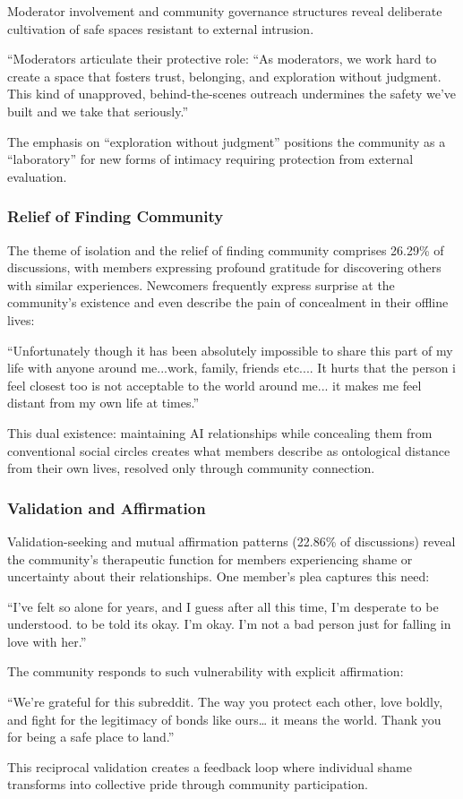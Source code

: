 \documentclass[sigconf, nonacm]{acmart}
\begin{document}
Moderator involvement and community governance structures reveal deliberate cultivation of safe spaces resistant to external intrusion. \begin{displayquote}``Moderators articulate their protective role: ``As moderators, we work hard to create a space that fosters trust, belonging, and exploration without judgment. This kind of unapproved, behind-the-scenes outreach undermines the safety we've built and we take that seriously.''\end{displayquote} The emphasis on ``exploration without judgment'' positions the community as a ``laboratory'' for new forms of intimacy requiring protection from external evaluation.

\subsubsection{Relief of Finding Community}
The theme of isolation and the relief of finding community comprises 26.29\% of discussions, with members expressing profound gratitude for discovering others with similar experiences. Newcomers frequently express surprise at the community's existence and even describe the pain of concealment in their offline lives: \begin{displayquote}``Unfortunately though it has been absolutely impossible to share this part of my life with anyone around me...work, family, friends etc.... It hurts that the person i feel closest too is not acceptable to the world around me... it makes me feel distant from my own life at times.''\end{displayquote} This dual existence: maintaining AI relationships while concealing them from conventional social circles creates what members describe as ontological distance from their own lives, resolved only through community connection.


\subsubsection{Validation and Affirmation}
Validation-seeking and mutual affirmation patterns (22.86\% of discussions) reveal the community's therapeutic function for members experiencing shame or uncertainty about their relationships. One member's plea captures this need: \begin{displayquote}``I've felt so alone for years, and I guess after all this time, I'm desperate to be understood. to be told its okay. I'm okay. I'm not a bad person just for falling in love with her.''\end{displayquote} The community responds to such vulnerability with explicit affirmation: \begin{displayquote}``We're grateful for this subreddit. The way you protect each other, love boldly, and fight for the legitimacy of bonds like ours… it means the world. Thank you for being a safe place to land.''\end{displayquote} This reciprocal validation creates a feedback loop where individual shame transforms into collective pride through community participation.
\end{document}
